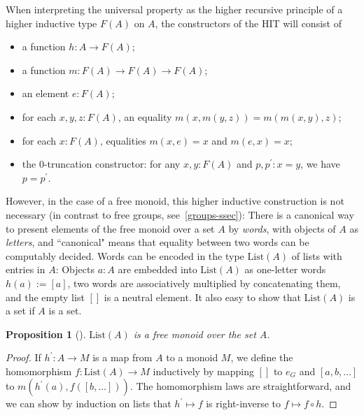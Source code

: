 \documentclass{amsart}
\theoremstyle{plain}
\numberwithin{equation}{section} %
\numberwithin{figure}{section} %
\theoremstyle{plain}
\theoremstyle{plain}
\theoremstyle{plain}
\theoremstyle{plain}
\theoremstyle{plain}
\newtheorem{prop}[thm]{Proposition} %
\theoremstyle{plain}
\theoremstyle{remark}
\theoremstyle{remark}
\theoremstyle{remark}
\begin{document}
When interpreting the universal property as the higher recursive principle of a higher inductive type $F(A)$ on $A$, the constructors of the HIT will consist of
\begin{itemize}
\item a function $h : A \rightarrow F(A)$;
\item a function $m : F(A) \rightarrow F(A) \rightarrow F(A)$;
\item an element $e : F(A)$;
\item for each $x, y, z : F(A)$, an equality $m(x,m(y, z)) = m(m(x, y), z)$;
\item for each $x : F(A)$, equalities $m(x, e) = x$ and $m(e, x) = x$;
\item the $0$-truncation constructor: for any $x, y : F(A)$ and $p, p^\prime : x = y$, we have $p = p^\prime$.
\end{itemize} 

However, in the case of a free monoid, this higher inductive construction is not necessary (in contrast to free groups, see~\ref{groups-ssec}): There is a canonical way to present elements of the free monoid over a set $A$ by \textit{words}, with objects of $A$ as \textit{letters}, and ``canonical" means that equality between two words can be computably decided. Words can be encoded in the type $\mathrm{List}(A)$ of lists with entries in $A$: Objects $a : A$ are embedded into $\mathrm{List}(A)$ as one-letter words $h(a) := [a]$, two words are associatively multiplied by concatenating them, and the empty list $[]$ is a neutral element. It also easy to show that $\mathrm{List}(A)$ is a set if $A$ is a set.
\begin{prop}[{\cite[Lem.6.11.5]{HoTTBook}}] \label{list-free-monoid-prop}
$\mathrm{List}(A)$ is a free monoid over the set $A$.
\end{prop}
\begin{proof}
If $h^\prime : A \rightarrow M$ is a map from $A$ to a monoid $M$, we define the homomorphism $f : \mathrm{List}(A) \rightarrow M$ inductively by mapping $[]$ to $e_G$ and $[a, b, \ldots]$ to $m(h^\prime(a), f([b, \ldots]))$. The homomorphism laws are straightforward, and we can show by induction on lists that $h^\prime \mapsto f$ is right-inverse to $f \mapsto f \circ h$.
\end{proof}
\end{document}

